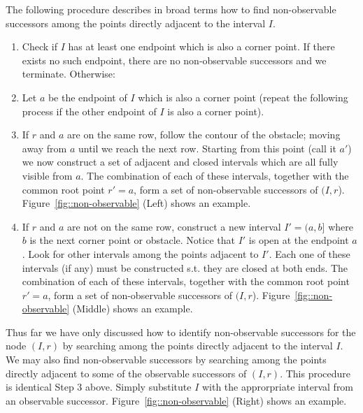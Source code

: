 The following procedure describes in broad terms how to find non-observable successors 
among the points directly adjacent to the interval $I$. 
\begin{enumerate}
\item Check if $I$ has at least one endpoint which is also a corner point. If
there exists no such endpoint, there are no non-observable successors and we
terminate. Otherwise:
\item Let $a$ be the endpoint of $I$ which is also a corner point (repeat the
following process if the other endpoint of $I$ is also a corner point).
\item If $r$ and $a$ are on the same row, follow the contour of the obstacle;
moving away from $a$ until we reach the next row. Starting from this point
(call it $a'$) we now construct a set of adjacent and closed intervals which
are all fully visible from $a$.  The combination of each of these intervals,
together with the common root point $r' = a$, form a set of non-observable
successors of $(I,r$). Figure~\ref{fig::non-observable} (Left) shows an
example.
\item If $r$ and $a$ are not on the same row, construct a new interval $I' =
(a, b]$ where $b$ is the next corner point or obstacle. Notice that $I'$ is
open at the endpoint $a$.  Look for other intervals among the points adjacent
to $I'$. Each one of these intervals (if any) must be constructed s.t. they
are closed at both ends.  The combination of each of these intervals,
together with the common root point $r' = a$, form a set of non-observable
successors of $(I,r$). Figure~\ref{fig::non-observable} (Middle) shows an
example.
\end{enumerate}

Thus far we have only discussed how to identify non-observable successors for
the node $(I, r)$ by searching among the points directly adjacent to the
interval $I$. We may also find non-observable successors by searching among
the points directly adjacent to some of the observable successors of $(I, r)$.
This procedure is identical Step 3 above. Simply substitute $I$ with the
approrpriate interval from an observable successor.
Figure~\ref{fig::non-observable} (Right) shows an example.

